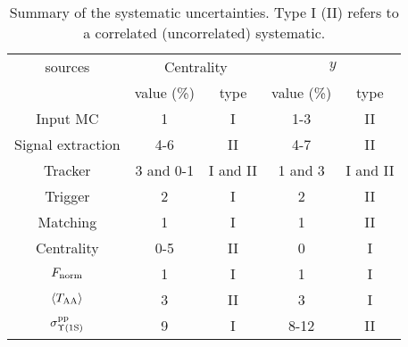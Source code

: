 \begin{table}[!htb]
\centering
\begin{tabular}{c|cc|cc}
\hline
sources & \multicolumn{2}{c|}{Centrality} & \multicolumn{2}{c}{$y$} \\
& value (\%) & type & value (\%) & type \\
\hline
Input MC     					& 1 			& I 		& 1-3 		& II \\
Signal extraction     				& 4-6 		& II 		& 4-7 		& II \\
Tracker						& 3 and 0-1 	& I and II 	& 1 and 3 		& I and II \\
Trigger						& 2  			& I 		& 2		 	& II \\
Matching 						& 1 			& I 		& 1 			& II \\
Centrality						& 0-5 		& II 		& 0			& I \\	
$F_{\rm{norm}}$          			& 1 			& I 		& 1 			& I \\
$\langle T_{\rm{AA}}\rangle$             & 3 			& II 		& 3 			& I \\
$\sigma^{\rm pp}_{\Upsilon\mathrm{(1S)}}$  		& 9 			& I 		& 8-12 		& II \\
\hline
\end{tabular}
\caption{\label{tablesys}Summary of the systematic uncertainties. Type I (II) refers to a correlated (uncorrelated) systematic.}
\end{table}